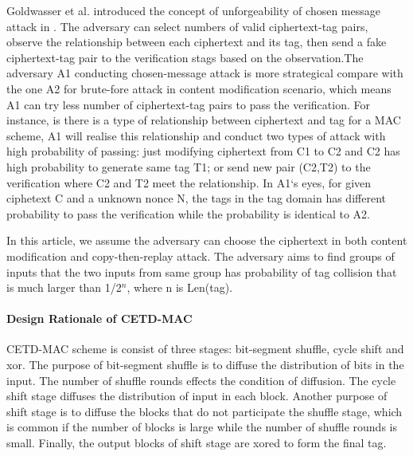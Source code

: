 \documentclass{article}
\begin{document}
Goldwasser et al. introduced the concept of unforgeability of chosen message attack in \cite{}. The adversary can select numbers of valid ciphertext-tag pairs, observe the relationship between each ciphertext and its tag, then send a fake ciphertext-tag pair to the verification stags based on the observation.The adversary A1 conducting chosen-message attack is more strategical compare with the one A2 for brute-fore attack in content modification scenario, which means A1 can try less number of ciphertext-tag pairs to pass the verification. 
For instance, is there is a type of relationship between ciphertext and tag for a MAC scheme, A1 will realise this relationship and conduct two types of attack with high probability of passing: just modifying ciphertext from C1 to C2 and C2 has high probability to generate same tag T1; or send new pair (C2,T2) to the verification where C2 and T2 meet the relationship. In A1`s eyes, for given ciphetext C and a unknown nonce N, the tags in the tag domain has different probability to pass the verification while the probability is identical to A2. 

In this article, we assume the adversary can choose the ciphertext in both content modification and copy-then-replay attack. The adversary aims to find groups of inputs that the two inputs from same group has probability of tag collision that is much larger than 1/2$^n$, where n is Len(tag). 

\paragraph{Design Rationale of CETD-MAC}
CETD-MAC scheme is consist of three stages: bit-segment shuffle, cycle shift and xor. The purpose of bit-segment shuffle is to diffuse the distribution of bits in the input. The number of shuffle rounds effects the condition of diffusion. 
The cycle shift stage diffuses the distribution of input in each block. Another purpose of shift stage is to diffuse the blocks that do not participate the shuffle stage, which is common if the number of blocks is large while the number of shuffle rounds is small. Finally, the output blocks of shift stage are xored to form the final tag. 

\end{document}
